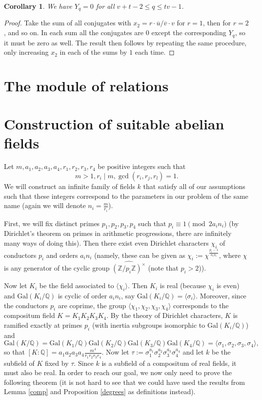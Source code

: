 \documentclass[12pt,a4paper]{article}
\newtheorem{cor}[theorem]{Corollary}
\newcommand{\Q}{\mathbb{Q}}
\newcommand{\Z}{\mathbb{Z}}
\newcommand{\Gal}{\mathrm{Gal}}
\newcommand{\uo}{\overline{u}}
\newcommand{\vo}{\overline{v}}
\begin{document}
\begin{cor}
We have $Y_q=0$ for all $v+t-2\leq q\leq tv-1$.
\end{cor}
\begin{proof}
Take the sum of all conjugates with $x_2=r\cdot\uo/\vo\cdot v$ for $r=1$, then for $r=2$, and so on. In each sum all the conjugates are $0$ except the corresponding $Y_q$, so it must be zero as well. The result then follows by repeating the same procedure, only increasing $x_2$ in each of the sums by $1$ each time.
\end{proof}
\section{The module of relations}
\section{Construction of suitable abelian fields}
Let $m,a_1,a_2,a_3,a_4,r_1,r_2,r_3,r_4$ be positive integers such that 
$$m>1, r_i\mid m, \gcd(r_i,r_j,r_l)=1.$$
We will construct an infinite family of fields $k$ that satisfy all of our assumptions such that these integers correspond to the parameters in our problem of the same name (again we will denote $n_i=\frac{m}{r_i}$).

First, we will fix distinct primes $p_1,p_2,p_3,p_4$ such that $p_i\equiv 1\pmod{ 2a_in_i}$ (by Dirichlet's theorem on primes in arithmetic progressions, there are infinitely many ways of doing this). Then there exist even Dirichlet characters $\chi_i$ of conductors $p_i$ and orders $a_in_i$ (namely, these can be given as $\chi_i:=\chi^{\frac{p_i-1}{a_in_i}}$, where $\chi$ is any generator of the cyclic group $\widehat{(\Z/p_i\Z)^\times}$ (note that $p_i>2$)).

Now let $K_i$ be the field associated to $\langle \chi_i\rangle$. Then $K_i$ is real (because $\chi_i$ is even) and $\Gal(K_i/\Q)$ is cyclic of order $a_in_i$, say $\Gal(K_i/\Q)=\langle \sigma_i\rangle$. Moreover, since the conductors $p_i$ are coprime, the group $\langle \chi_1,\chi_2,\chi_3,\chi_4\rangle$ corresponds to the compositum field $K=K_1K_2K_3K_4$. By the theory of Dirichlet characters, $K$ is ramified exactly at primes $p_i$ (with inertia subgroups isomorphic to $\Gal(K_i/\Q)$) and $$\Gal(K/\Q)=\Gal(K_1/\Q)\Gal(K_2/\Q)\Gal(K_3/\Q)\Gal(K_4/\Q)=\langle\sigma_1,\sigma_2,\sigma_3,\sigma_4\rangle,$$
so that $[K:\Q]=a_1a_2a_3a_4\frac{m^4}{r_1r_2r_3r_4}$. Now let $\tau:=\sigma_1^{a_1}\sigma_2^{a_2}\sigma_3^{a_3}\sigma_4^{a_4}$ and let $k$ be the subfield of $K$ fixed by $\tau$. Since $k$ is a subfield of a compositum of real fields, it must also be real. In order to reach our goal, we now only need to prove the following theorem (it is not hard to see that we could have used the results from Lemma \ref{comp} and Proposition \ref{degrees} as definitions instead).
\end{document}
